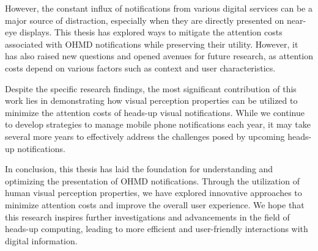However, the constant influx of notifications from various digital services can be a major source of distraction, especially when they are directly presented on near-eye displays. This thesis has explored ways to mitigate the attention costs associated with OHMD notifications while preserving their utility. However, it has also raised new questions and opened avenues for future research, as attention costs depend on various factors such as context and user characteristics.

Despite the specific research findings, the most significant contribution of this work lies in demonstrating how visual perception properties can be utilized to minimize the attention costs of heads-up visual notifications. While we continue to develop strategies to manage mobile phone notifications each year, it may take several more years to effectively address the challenges posed by upcoming heads-up notifications.

In conclusion, this thesis has laid the foundation for understanding and optimizing the presentation of OHMD notifications. Through the utilization of human visual perception properties, we have explored innovative approaches to minimize attention costs and improve the overall user experience. We hope that this research inspires further investigations and advancements in the field of heads-up computing, leading to more efficient and user-friendly interactions with digital information.